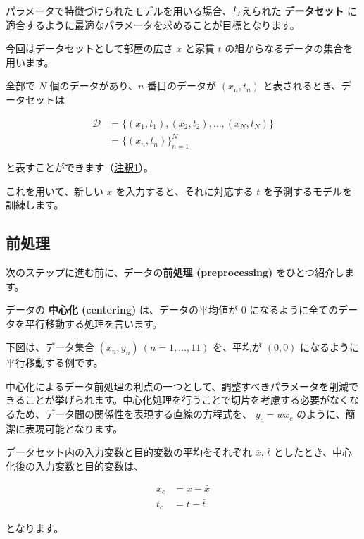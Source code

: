 パラメータで特徴づけられたモデルを用いる場合、与えられた \textbf{データセット} に適合するように最適なパラメータを求めることが目標となります。

今回はデータセットとして部屋の広さ $x$ と家賃 $t$ の組からなるデータの集合を用います。

全部で $N$ 個のデータがあり、$n$ 番目のデータが $(x_n, t_n)$ と表されるとき、データセットは


\begin{align}
\mathcal{D}
&= \{(x_1, t_1), (x_2, t_2), \dots, (x_N, t_N)\} \\
&= \{(x_n, t_n)\}_{n=1}^{N}
\end{align}


と表すことができます（\hyperref[21-regression-analysis-note1]{注釈1}）。

これを用いて、新しい $x$ を入力すると、それに対応する $t$ を予測するモデルを訓練します。


\subsection{前処理}


次のステップに進む前に、データの\textbf{前処理 (preprocessing)} をひとつ紹介します。

データの \textbf{中心化 (centering)} は、データの平均値が 0 になるように全てのデータを平行移動する処理を言います。

下図は、データ集合 $(x_n, y_n) \ (n=1,\dots,11)$ を、平均が $(0, 0)$ になるように平行移動する例です。




中心化によるデータ前処理の利点の一つとして、調整すべきパラメータを削減できることが挙げられます。中心化処理を行うことで切片を考慮する必要がなくなるため、データ間の関係性を表現する直線の方程式を、 $y_c = wx_c$ のように、簡潔に表現可能となります。




データセット内の入力変数と目的変数の平均をそれぞれ $\bar{x}$, $\bar{t}$ としたとき、中心化後の入力変数と目的変数は、


\[
\begin{aligned}
x_{c} &= x - \bar{x} \\
t_{c} &= t - \bar{t}
\end{aligned}
\]


となります。



